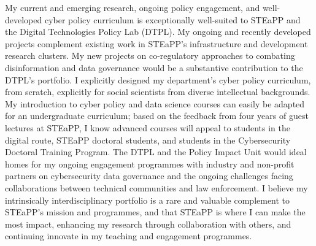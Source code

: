 \documentclass[11pt]{letter}
\begin{document}
\begin{letter}
My current and emerging research, ongoing policy engagement, and well-developed cyber policy curriculum is exceptionally well-suited to STEaPP and the Digital Technologies Policy Lab (DTPL).
%
My ongoing and recently developed projects complement existing work in STEaPP's infrastructure and development research clusters.
%
My new projects on co-regulatory approaches to combating disinformation and data governance would be a substantive contribution to the DTPL's portfolio.
%
I explicitly designed my department's cyber policy curriculum, from scratch, explicitly for social scientists from diverse intellectual backgrounds.
%
My introduction to cyber policy and data science courses can easily be adapted for an undergraduate curriculum; based on the feedback from four years of guest lectures at STEaPP, I know advanced courses will appeal to students in the digital route, STEaPP doctoral students, and students in the Cybersecurity Doctoral Training Program.
%
The DTPL and the Policy Impact Unit would ideal homes for my ongoing engagement programmes with industry and non-profit partners on cybersecurity data governance and the ongoing challenges facing collaborations between technical communities and law enforcement.
%
I believe my intrinsically interdisciplinary portfolio is a rare and valuable complement to STEaPP's mission and programmes, and that STEaPP is where I can make the most impact, enhancing my research through collaboration with others, and continuing innovate in my teaching and engagement programmes.





%
%


%





\end{letter}
\end{document}
